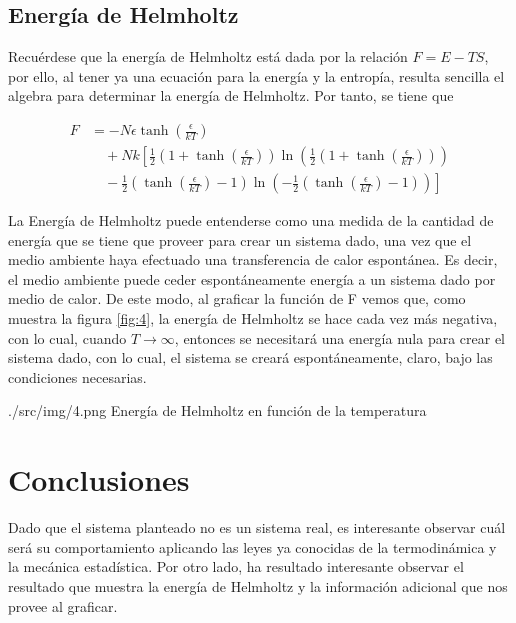 \subsection{Energía de Helmholtz}
Recuérdese que la energía de Helmholtz está dada por la relación $F = E -TS$, por ello, al tener ya una ecuación para la energía y la entropía, resulta sencilla el algebra para determinar la energía de Helmholtz. Por tanto, se tiene que

{\scriptsize
\begin{equation}
    \begin{split}
        F &= -N\epsilon\tanh{\left(\frac{\epsilon}{kT}\right)} \\
        &\quad + Nk\left[
            \frac{1}{2} \left( 1+\tanh{\left( \frac{\epsilon}{kT} \right)} \right)
                \ln\left( \frac{1}{2} \left( 1 + \tanh{\left( \frac{\epsilon}{kT} \right)} \right) \right) \right. \\
            &\quad - \left. \frac{1}{2} \left( \tanh{\left( \frac{\epsilon}{kT} \right)} - 1 \right)
                \ln\left( -\frac{1}{2} \left( \tanh{\left( \frac{\epsilon}{kT} \right)} - 1 \right) \right)
        \right]
    \end{split}
\end{equation}
}

La Energía de Helmholtz puede entenderse como una medida de la cantidad de energía que se tiene que proveer para crear un sistema dado, una vez que el medio ambiente haya efectuado una transferencia de calor espontánea. Es decir, el medio ambiente puede ceder espontáneamente energía a un sistema dado por medio de calor. De este modo, al graficar la función de F vemos que, como muestra la figura \ref*{fig:4}, la energía de Helmholtz se hace cada vez más negativa, con lo cual, cuando $T \rightarrow \infty$, entonces se necesitará una energía nula para crear el sistema dado, con lo cual, el sistema se creará espontáneamente, claro, bajo las condiciones necesarias.

\imagen
{./src/img/4.png}
{Energía de Helmholtz en función de la temperatura}
{\label{fig:4}}

\section{Conclusiones}
Dado que el sistema planteado no es un sistema real, es interesante observar cuál será su comportamiento aplicando las leyes ya conocidas de la termodinámica y la mecánica estadística. Por otro lado, ha resultado interesante observar el resultado que muestra la energía de Helmholtz y la información adicional que nos provee al graficar.
